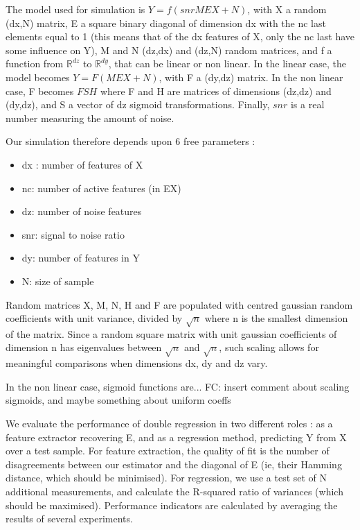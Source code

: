 \documentclass{article}
\begin{document}
The model used for simulation is $Y=f(snr MEX+N)$, with X a random (dx,N) matrix, E a square binary diagonal of dimension dx with the nc last elements equal to 1 (this means that of the dx features of X, only the nc last have some influence on Y), M and N (dz,dx) and (dz,N) random matrices, and f a function from $\mathbb{R}^{dz}$ to $\mathbb{R}^{dy}$, that can be linear or non linear.
%
In the linear case, the model becomes $Y=F(MEX+N)$, with F a (dy,dz) matrix.
%
In the non linear case, F becomes $FSH$ where F and H are matrices of dimensions (dz,dz) and (dy,dz), and S a vector of dz sigmoid transformations.
%
Finally, $snr$ is a real number measuring the amount of noise.

Our simulation therefore depends upon 6 free parameters :
\begin{itemize}
\item dx : number of features of X
\item nc: number of active features (in EX)
\item dz: number of noise features
\item snr: signal to noise ratio
\item dy: number of features in Y
\item N: size of sample
\end{itemize}

Random matrices X, M, N, H and F are populated with centred gaussian random coefficients with unit variance, divided by $ \surd n$ where n is the smallest dimension of the matrix.
%
Since a random square matrix with unit gaussian coefficients of dimension n has eigenvalues between $ \surd n $ and $\surd n $, such  scaling allows for meaningful comparisons when dimensions dx, dy and dz vary.

In the non linear case, sigmoid functions are...
FC: insert comment about scaling sigmoids, and maybe something about uniform coeffs

We evaluate the performance of double regression in two different roles : as a feature extractor recovering E, and as a regression method, predicting Y from X over a test sample.
%
For feature extraction, the quality of fit is the number of disagreements between our estimator and the diagonal of E (ie, their Hamming distance, which should be minimised).
%
For regression, we use a test set of N additional measurements, and calculate the R-squared ratio of variances (which should be maximised).
%
Performance indicators are calculated by averaging the results of several experiments.
\end{document}
